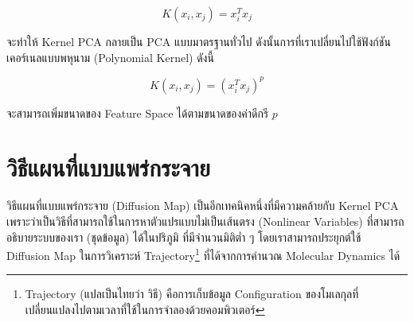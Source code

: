 \begin{equation}
    K(x_{i},x_{j}) = x^{T}_{i}x_{j} 
\end{equation}

\noindent จะทำให้ Kernel PCA กลายเป็น PCA แบบมาตรฐานทั่วไป ดังนั้นการที่เราเปลี่ยนไปใช้ฟังก์ชันเคอร์เนลแบบพหุนาม (Polynomial 
Kernel) ดังนี้

\begin{equation} 
    K(x_{i},x_{j}) = (x^{T}_{i}x_{j})^{p}
\end{equation}

\noindent จะสามารถเพิ่มขนาดของ Feature Space ได้ตามขนาดของค่าดีกรี $p$

\section{วิธีแผนที่แบบแพร่กระจาย}
\label{sec:diff_map}

วิธีแผนที่แบบแพร่กระจาย (Diffusion Map)\autocite{coifman2005,coifman2006} เป็นอีกเทคนิคหนึ่งที่มีความคล้ายกับ Kernel PCA 
เพราะว่าเป็นวิธีที่สามารถใช้ในการหาตัวแปรแบบไม่เป็นเส้นตรง (Nonlinear Variables) ที่สามารถอธิบายระบบของเรา (ชุดข้อมูล) ได้ในปริภูมิ%
ที่มีจำนวนมิติต่ำ ๆ โดยเราสามารถประยุกต์ใช้ Diffusion Map ในการวิเคราะห์ Trajectory\footnote{Trajectory (แปลเป็นไทยว่า วิธี) 
คือการเก็บข้อมูล Configuration ของโมเลกุลที่เปลี่ยนแปลงไปตามเวลาที่ใช้ในการจำลองด้วยคอมพิวเตอร์} ที่ได้จากการคำนวณ Molecular 
Dynamics ได้

